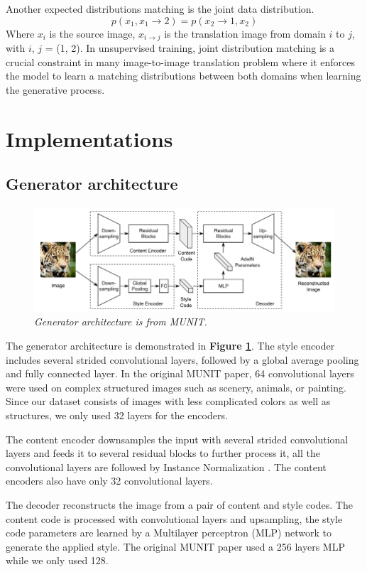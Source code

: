 \documentclass[12pt]{report}
\begin{document}
Another expected distributions matching is the joint data distribution.
\[p(x_1, x_1\rightarrow2) = p(x_2\rightarrow1, x_2)\]
Where $x_i$ is the source image, $x_{i\rightarrow j}$ is the translation image from domain $i$ to $j$, with $i$, $j$ = (1, 2). In unsupervised training, joint distribution matching is a crucial constraint in many image-to-image translation problem where it enforces the model to learn a matching distributions between both domains when learning the generative process.

\section{Implementations}
\subsection{Generator architecture}
\begin{figure}[h]
	\centering
	\includegraphics[scale=0.8]{gen-architecture}
	\caption{\textit{Generator architecture is from MUNIT\cite{munit}.}}
	\label{fig:gen-architecture}
\end{figure}
The generator architecture is demonstrated in \textbf{Figure \ref{fig:gen-architecture}}. The style encoder includes several strided convolutional layers, followed by a global average pooling and fully connected layer. In the original MUNIT paper\cite{munit}, 64 convolutional layers were used on complex structured images such as scenery, animals, or painting. Since our dataset consists of images with less complicated colors as well as structures, we only used 32 layers for the encoders.

The content encoder downsamples the input with several strided convolutional layers and feeds it to several residual blocks \cite{resnet} to further process it, all the convolutional layers are followed by Instance Normalization \cite{instance-norm}. The content encoders also have only 32 convolutional layers.

The decoder reconstructs the image from a pair of content and style codes. The content code is processed with convolutional layers and upsampling, the style code parameters are learned by a Multilayer perceptron (MLP) \cite{mlp} network to generate the applied style. The original MUNIT paper\cite{munit} used a 256 layers MLP while we only used 128.
\end{document}
